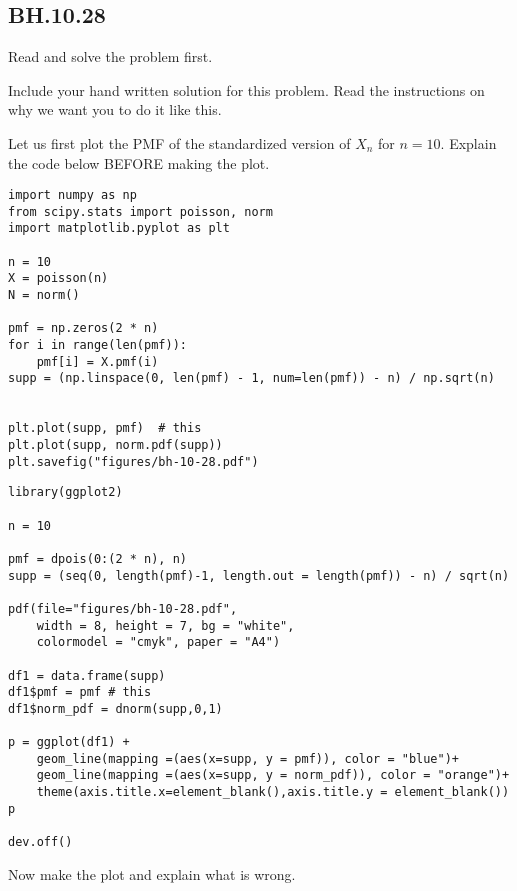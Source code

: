 

\subsection{BH.10.28}

Read and solve the problem first.

\begin{exercise}
Include your hand written solution for this problem. Read the instructions on why we want you to do it like this.
\end{exercise}

\begin{exercise}
Let us first plot the PMF of the standardized version of $X_{n}$ for $n=10$. Explain the code below BEFORE making the plot.
\end{exercise}

\begin{verbatim}
import numpy as np
from scipy.stats import poisson, norm
import matplotlib.pyplot as plt

n = 10
X = poisson(n)
N = norm()

pmf = np.zeros(2 * n)
for i in range(len(pmf)):
    pmf[i] = X.pmf(i)
supp = (np.linspace(0, len(pmf) - 1, num=len(pmf)) - n) / np.sqrt(n)


plt.plot(supp, pmf)  # this
plt.plot(supp, norm.pdf(supp))
plt.savefig("figures/bh-10-28.pdf")
\end{verbatim}

\begin{verbatim}
library(ggplot2)

n = 10

pmf = dpois(0:(2 * n), n)
supp = (seq(0, length(pmf)-1, length.out = length(pmf)) - n) / sqrt(n)

pdf(file="figures/bh-10-28.pdf",
    width = 8, height = 7, bg = "white",
    colormodel = "cmyk", paper = "A4")

df1 = data.frame(supp)
df1$pmf = pmf # this
df1$norm_pdf = dnorm(supp,0,1)

p = ggplot(df1) +
    geom_line(mapping =(aes(x=supp, y = pmf)), color = "blue")+
    geom_line(mapping =(aes(x=supp, y = norm_pdf)), color = "orange")+
    theme(axis.title.x=element_blank(),axis.title.y = element_blank())
p

dev.off()
\end{verbatim}

\begin{exercise}
Now make the plot and  explain what is wrong.
\end{exercise}

